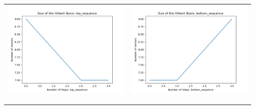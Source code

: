 \documentclass[10pt]{article}
\begin{document}
\begin{tabular}{c|c}
\begin{minipage}{.4\textwidth}
\includegraphics[width=\textwidth]{"DATA/5d/5 generators 1 bound I/top_sequence SIZE"}
\end{minipage} &
\begin{minipage}{.4\textwidth}
\includegraphics[width=\textwidth]{"DATA/5d/5 generators 1 bound I bottomup/bottom_sequence SIZE"}
\end{minipage} \\ \\
\hline \\\begin{minipage}{.4\textwidth}

\end{minipage}
\end{tabular}
\end{document}
